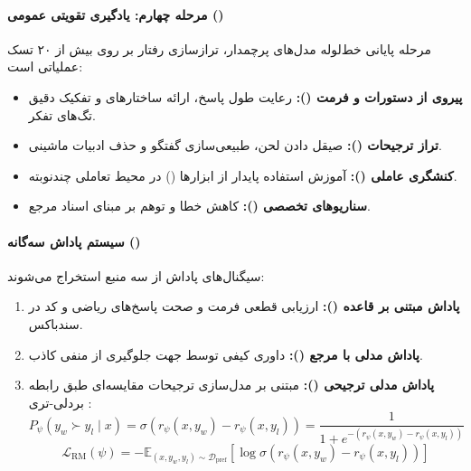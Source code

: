 \paragraph*{مرحله چهارم: یادگیری تقویتی عمومی ()}
مرحله پایانی خط‌لوله مدل‌های پرچمدار، ترازسازی رفتار بر روی بیش از ۲۰ تسک عملیاتی است:
\begin{itemize}
    \item \textbf{پیروی از دستورات و فرمت ():} رعایت طول پاسخ، ارائه ساختارهای  و تفکیک دقیق تگ‌های تفکر.
    \item \textbf{تراز ترجیحات ():} صیقل دادن لحن، طبیعی‌سازی گفتگو و حذف ادبیات ماشینی.
    \item \textbf{کنشگری عاملی ():} آموزش استفاده پایدار از ابزارها () در محیط تعاملی چندنوبته.
    \item \textbf{سناریوهای تخصصی ():} کاهش خطا و توهم بر مبنای اسناد مرجع.
\end{itemize}

\paragraph*{سیستم پاداش سه‌گانه ()}
سیگنال‌های پاداش از سه منبع استخراج می‌شوند:
\begin{enumerate}
    \item \textbf{پاداش مبتنی بر قاعده ():} ارزیابی قطعی فرمت و صحت پاسخ‌های ریاضی و کد در سندباکس.
    \item \textbf{پاداش مدلی با مرجع ():} داوری کیفی توسط  جهت جلوگیری از منفی کاذب.
    \item \textbf{پاداش مدلی ترجیحی ():} مبتنی بر مدل‌سازی ترجیحات مقایسه‌ای طبق رابطه بردلی-تری \cite{bradley1952}:
    \begin{equation}
        P_\psi(y_w \succ y_l \mid x) = \sigma(r_\psi(x, y_w) - r_\psi(x, y_l)) = \frac{1}{1 + e^{-(r_\psi(x, y_w) - r_\psi(x, y_l))}}
    \end{equation}
    \begin{equation}
        \mathcal{L}_{\text{RM}}(\psi) = - \mathbb{E}_{(x, y_w, y_l) \sim \mathcal{D}_{\text{pref}}} \left[ \log \sigma(r_\psi(x, y_w) - r_\psi(x, y_l)) \right]
    \end{equation}
\end{enumerate}


